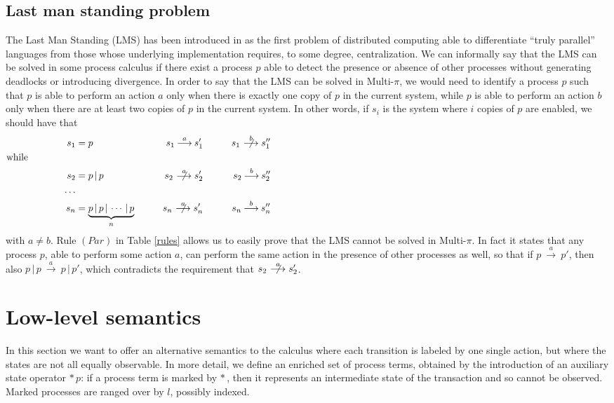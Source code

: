 \documentclass[submission,copyright,creativecommons]{eptcs}
\newcommand{\deriv}[1]{{\mbox{${\:\stackrel{#1}{\longrightarrow}\:}$}}}
\newcommand{\nderiv}[1]{{\mbox{${\;\;\;\not\!\!\!\stackrel{#1}{\longrightarrow}\;}$}
}}
\newcommand{\para}{\mbox{$\,|\,$}}
\newcommand{\istar}{\mbox{$*\,$}}
\begin{document}
\subsection{Last man standing problem}
The Last Man Standing (LMS) has been introduced in \cite{VBG09} as the first problem of distributed computing able to differentiate
``truly parallel'' languages from those whose underlying implementation requires, to some degree, centralization.
We can informally say that the LMS can be solved in some process calculus if there exist a process $p$ able to
detect the presence or absence of other processes without generating deadlocks or introducing divergence. In order to say that the LMS can be solved in Multi-$\pi$,
we would need to identify a process $p$ such that $p$ is able to perform an action $a$ only when there is exactly one copy of $p$ in the current system, while $p$ is able to perform an action $b$ only when there are at least two copies of $p$ in the current system. In other words, if $s_i$ is the system where $i$ copies of $p$ are enabled, we should have that
\begin{align*}
& &  s_1 &= p           & s_1 \deriv{a} s_1' & & \qquad s_1 \nderiv{b} s_1'' \\
\text{while} \hspace{1cm} \\
& & s_2 &= p \para p           & s_2 \nderiv{a} s_2' & & \qquad s_2 \deriv{b} s_2'' \\
& & \ldots \\
& & s_n &= \underbrace{p \para p \para \cdots \para p}_{n} & \qquad s_n \nderiv{a} s_n' & & \qquad s_n \deriv{b} s_n'' & \hspace{\textwidth}
\end{align*}
with $a \neq b$. 
Rule $(Par)$ in Table \ref{rules} allows us to easily prove that the LMS cannot be solved in Multi-$\pi$. In fact it
states that any process $p$, able to perform some action $a$,
can perform the same action in the presence of other processes as well, so that if $p \deriv{a} p'$, then also $p \para p \deriv{a} p \para p'$, which contradicts the requirement
that $s_2 \nderiv{a} s_2'$.




\section{Low-level semantics\\[-.6cm]}\label{multi-low}

In this section we want to offer an alternative semantics to the calculus where each transition is labeled by one single action,
but where the states are not all equally observable. In more detail, we define an enriched set of process terms, obtained by 
the introduction of an auxiliary state operator $\istar p$: if a process term is marked by $\istar$, then it represents an intermediate
state of the transaction and so cannot be observed. Marked processes are ranged over by $l$, possibly indexed.
\end{document}
